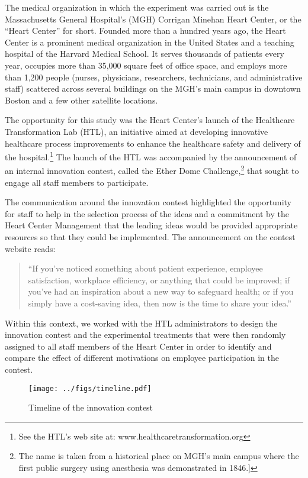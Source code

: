 \documentclass[11pt]{article}
\begin{document}
The medical organization in which the experiment was carried out is the
Massachusetts General Hospital's (MGH) Corrigan Minehan Heart Center, or
the ``Heart Center'' for short. Founded more than a hundred years ago,
the Heart Center is a prominent medical organization in the United
States and a teaching hospital of the Harvard Medical School. It serves
thousands of patients every year, occupies more than 35,000 square feet
of office space, and employs more than 1,200 people (nurses, physicians,
researchers, technicians, and administrative staff) scattered across
several buildings on the MGH's main campus in downtown Boston and a few
other satellite locations.

The opportunity for this study was the Heart Center's launch of the
Healthcare Transformation Lab (HTL), an initiative aimed at developing
innovative healthcare process improvements to enhance the healthcare
safety and delivery of the hospital.\footnote{See the HTL's web site at:
  www.healthcaretransformation.org} The launch of the HTL was
accompanied by the announcement of an internal innovation contest,
called the Ether Dome Challenge,\footnote{The name is taken from a
  historical place on MGH's main campus where the first public surgery
  using anesthesia was demonstrated in 1846.{]}} that sought to engage
all staff members to participate.

The communication around the innovation contest highlighted the
opportunity for staff to help in the selection process of the ideas and
a commitment by the Heart Center Management that the leading ideas would
be provided appropriate resources so that they could be implemented. The
announcement on the contest website reads:

\begin{quote}
``If you've noticed something about patient experience, employee
satisfaction, workplace efficiency, or anything that could be improved;
if you've had an inspiration about a new way to safeguard health; or if
you simply have a cost-saving idea, then now is the time to share your
idea.''
\end{quote}

Within this context, we worked with the HTL administrators to design the
innovation contest and the experimental treatments that were then
randomly assigned to all staff members of the Heart Center in order to
identify and compare the effect of different motivations on employee
participation in the contest.

\begin{figure}
\centering
\caption{Timeline of the innovation contest}
\label{timeline}
\texttt{[image: ../figs/timeline.pdf]}
\end{figure}
\end{document}
